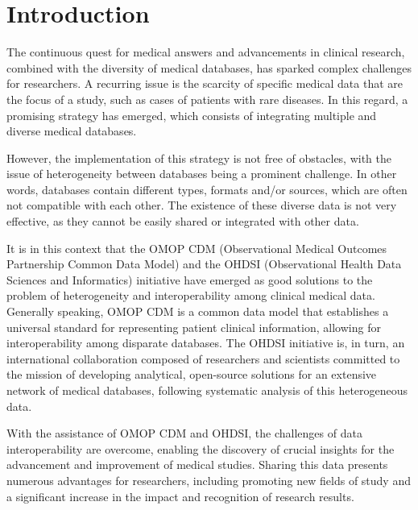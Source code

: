 \chapter{Introduction}
\label{chapter:Introduction}

%
% 
%


The continuous quest for medical answers and advancements in clinical research, combined with the diversity of medical databases, has sparked complex challenges for researchers. A recurring issue is the scarcity of specific medical data that are the focus of a study, such as cases of patients with rare diseases. In this regard, a promising strategy has emerged, which consists of integrating multiple and diverse medical databases.

However, the implementation of this strategy is not free of obstacles, with the issue of heterogeneity between databases being a prominent challenge. In other words, databases contain different types, formats and/or sources, which are often not compatible with each other. The existence of these diverse data is not very effective, as they cannot be easily shared or integrated with other data.

It is in this context that the OMOP CDM (Observational Medical Outcomes Partnership Common Data Model) and the OHDSI (Observational Health Data Sciences and Informatics) initiative have emerged as good solutions to the problem of heterogeneity and interoperability among clinical medical data. Generally speaking, OMOP CDM is a common data model that establishes a universal standard for representing patient clinical information, allowing for interoperability among disparate databases. The OHDSI initiative is, in turn, an international collaboration composed of researchers and scientists committed to the mission of developing analytical, open-source solutions for an extensive network of medical databases, following systematic analysis of this heterogeneous data.

With the assistance of OMOP CDM and OHDSI, the challenges of data interoperability are overcome, enabling the discovery of crucial insights for the advancement and improvement of medical studies. Sharing this data presents numerous advantages for researchers, including promoting new fields of study and a significant increase in the impact and recognition of research results.


